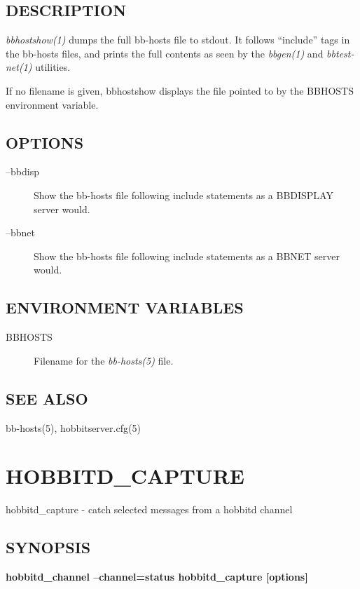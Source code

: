  
\subsection{DESCRIPTION}
\emph{bbhostshow(1)} dumps the full bb-hosts file to stdout. It
follows ``include'' tags in the bb-hosts files, and prints the full
contents as seen by the \emph{bbgen(1)} and \emph{bbtest-net(1)} utilities. 

  If no filename is given, bbhostshow displays the file pointed to by
  the BBHOSTS environment variable. 



 
\subsection{OPTIONS}
\begin{description}
\item[--bbdisp] Show the bb-hosts file following include statements as
  a BBDISPLAY server would. 


 

\item[--bbnet] Show the bb-hosts file following include statements as
  a BBNET server would. 

\end{description}
\subsection{ENVIRONMENT VARIABLES}
\begin{description}
\item[BBHOSTS] Filename for the \emph{bb-hosts(5)}
 file. 

 


\end{description}
\subsection{SEE ALSO}
bb-hosts(5), hobbitserver.cfg(5) 

  
%
\newpage
\section{HOBBITD\_CAPTURE}

 hobbitd\_capture - catch selected messages from a hobbitd channel

\subsection{SYNOPSIS}
\textbf{hobbitd\_channel --channel=status hobbitd\_capture [options]}


